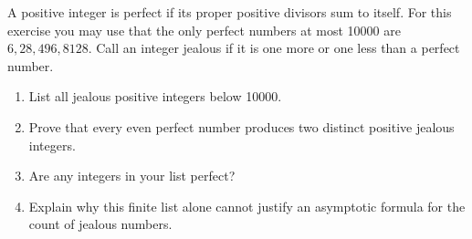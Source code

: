 A positive integer is perfect if its proper positive divisors sum to itself. For this exercise you may use that the only perfect numbers at most 10000 are $6,28,496,8128$. Call an integer jealous if it is one more or one less than a perfect number.\begin{enumerate}\item List all jealous positive integers below 10000.\item Prove that every even perfect number produces two distinct positive jealous integers.\item Are any integers in your list perfect?\item Explain why this finite list alone cannot justify an asymptotic formula for the count of jealous numbers.\end{enumerate}
